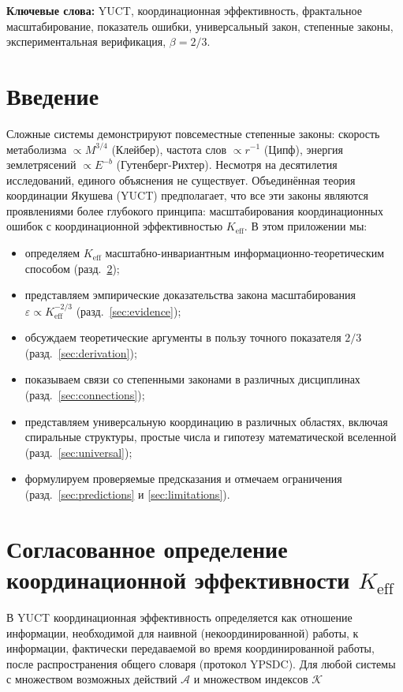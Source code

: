 \documentclass[12pt]{article}
\newcommand{\Keff}{K_{\mathrm{eff}}}
\newcommand{\eps}{\varepsilon}
\begin{document}
\begin{titlepage}
\begin{center}
			\textbf{Ключевые слова:} YUCT, координационная эффективность, фрактальное масштабирование, показатель ошибки, универсальный закон, степенные законы, экспериментальная верификация, \(\beta = 2/3\).
		\end{center}
	\end{titlepage}
	
	\tableofcontents
	\newpage
	
	\section{Введение}
	Сложные системы демонстрируют повсеместные степенные законы: скорость метаболизма \(\propto M^{3/4}\) (Клейбер), частота слов \(\propto r^{-1}\) (Ципф), энергия землетрясений \(\propto E^{-b}\) (Гутенберг-Рихтер). Несмотря на десятилетия исследований, единого объяснения не существует. Объединённая теория координации Якушева (YUCT) предполагает, что все эти законы являются проявлениями более глубокого принципа: масштабирования координационных ошибок с координационной эффективностью \(\Keff\). В этом приложении мы:
	\begin{itemize}
		\item определяем \(\Keff\) масштабно-инвариантным информационно-теоретическим способом (разд.~\ref{sec:keff});
		\item представляем эмпирические доказательства закона масштабирования \(\eps \propto \Keff^{-2/3}\) (разд.~\ref{sec:evidence});
		\item обсуждаем теоретические аргументы в пользу точного показателя \(2/3\) (разд.~\ref{sec:derivation});
		\item показываем связи со степенными законами в различных дисциплинах (разд.~\ref{sec:connections});
		\item представляем универсальную координацию в различных областях, включая спиральные структуры, простые числа и гипотезу математической вселенной (разд.~\ref{sec:universal});
		\item формулируем проверяемые предсказания и отмечаем ограничения (разд.~\ref{sec:predictions} и \ref{sec:limitations}).
	\end{itemize}
	
	\section{Согласованное определение координационной эффективности \(\Keff\)}
	\label{sec:keff}
	
	В YUCT координационная эффективность определяется как отношение информации, необходимой для наивной (некоординированной) работы, к информации, фактически передаваемой во время координированной работы, после распространения общего словаря (протокол YPSDC). Для любой системы с множеством возможных действий \(\mathcal{A}\) и множеством индексов \(\mathcal{K}\)
	
\end{document}
